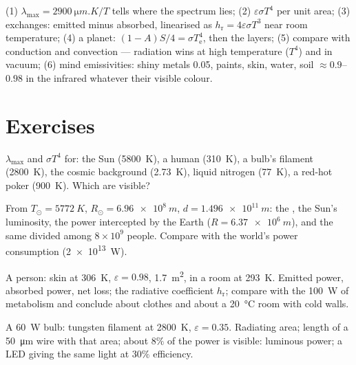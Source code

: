 \begin{method}\label{meth:b2:thermal-radiation:method}
(1) $\lambda_{\max} = \qty{2900}{\micro m.K}/T$ tells where the spectrum
lies; (2) $\varepsilon\sigma T^4$ per unit area; (3) exchanges: emitted
minus absorbed, linearised as $h_{\text{r}} = 4\varepsilon\sigma T^3$ near
room temperature; (4) a planet: $(1 - A)S/4 = \sigma T_{\text{e}}^4$, then
the layers; (5) compare with conduction and convection --- radiation
wins at high temperature ($T^4$) and in vacuum; (6) mind emissivities:
shiny metals \qty{0.05}{}, paints, skin, water, soil $\approx 0.9$--$0.98$
in the infrared whatever their visible colour.
\end{method}

\section{Exercises}

\begin{exercise}[$\star$]\label{exo:b2:thermal-radiation:1}
$\lambda_{\max}$ and $\sigma T^4$ for: the Sun (\qty{5800}{K}), a human
(\qty{310}{K}), a bulb's filament (\qty{2800}{K}), the cosmic background
(\qty{2.73}{K}), liquid nitrogen (\qty{77}{K}), a red-hot poker
(\qty{900}{K}). Which are visible?
\end{exercise}

\begin{exercise}[$\star$]\label{exo:b2:thermal-radiation:2}
From $T_\odot = \qty{5772}{K}$, $R_\odot = \qty{6.96e8}{m}$, $d = \qty{1.496e11}{m}$:
the , the Sun's luminosity, the power intercepted by the
Earth ($R = \qty{6.37e6}{m}$), and the same divided among $8 \times 10^9$
people. Compare with the world's power consumption (\qty{2e13}{W}).
\end{exercise}

\begin{exercise}[$\star$]\label{exo:b2:thermal-radiation:3}
A person: skin at \qty{306}{K}, $\varepsilon = 0.98$, \qty{1.7}{m^2}, in a
room at \qty{293}{K}. Emitted power, absorbed power, net loss; the
radiative coefficient $h_{\text{r}}$; compare with the \qty{100}{W} of
metabolism and conclude about clothes and about a \qty{20}{\celsius}
room with cold walls.
\end{exercise}

\begin{exercise}[$\star$]\label{exo:b2:thermal-radiation:4}
A \qty{60}{W} bulb: tungsten filament at \qty{2800}{K}, $\varepsilon = 0.35$.
Radiating area; length of a \qty{50}{\micro m} wire with that area;
about $8\%$ of the power is visible: luminous power; a LED giving the
same light at $30\%$ efficiency.
\end{exercise}

